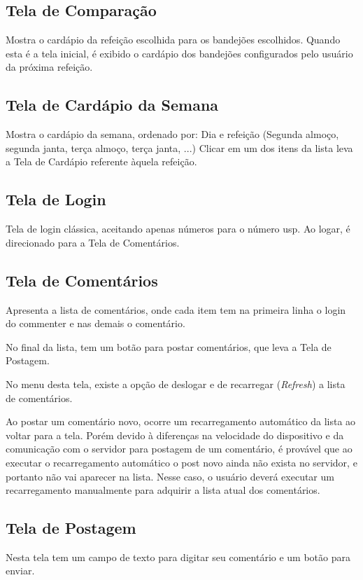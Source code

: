 \subsection{Tela de Comparação}
Mostra o cardápio da refeição escolhida para os bandejões escolhidos. Quando esta é a tela inicial, é exibido o cardápio dos bandejões configurados pelo usuário da próxima refeição.

\subsection{Tela de Cardápio da Semana}
Mostra o cardápio da semana, ordenado por: Dia e refeição (Segunda almoço, segunda janta, terça almoço, terça janta, ...)
Clicar em um dos itens da lista leva a Tela de Cardápio referente àquela refeição.

\subsection{Tela de Login}
Tela de login clássica, aceitando apenas números para o número usp. Ao logar, é direcionado para a Tela de Comentários.

\subsection{Tela de Comentários}
Apresenta a lista de comentários, onde cada item tem na primeira linha o login do commenter e nas demais o comentário.

No final da lista, tem um botão para postar comentários, que leva a Tela de Postagem.

No menu desta tela, existe a opção de deslogar e de recarregar (\textit{Refresh}) a lista de comentários. 

Ao postar um comentário novo, ocorre um recarregamento automático da lista ao voltar para a tela. Porém devido à diferenças na velocidade do dispositivo e da comunicação
com o servidor para postagem de um comentário, é provável que ao executar o recarregamento automático o post novo ainda não exista no servidor, e portanto não vai aparecer na lista.
Nesse caso, o usuário deverá executar um recarregamento manualmente para adquirir a lista atual dos comentários.

\subsection{Tela de Postagem}
Nesta tela tem um campo de texto para digitar seu comentário e um botão para enviar.

